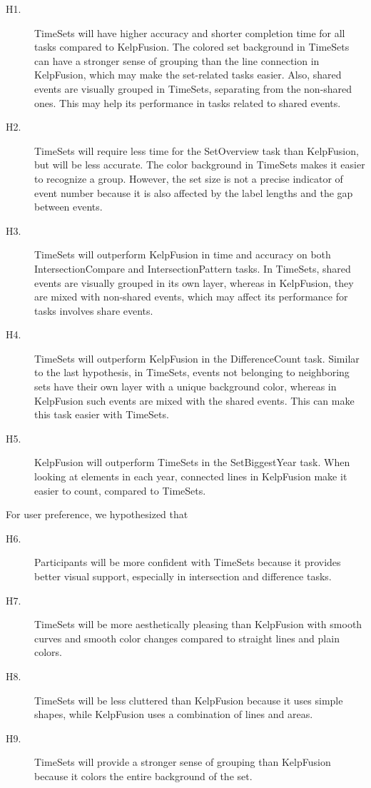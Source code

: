 \begin{description}
	\item [H1.] TimeSets will have higher accuracy and shorter completion time for all tasks compared to KelpFusion. The colored set background in TimeSets can have a stronger sense of grouping than the line connection in KelpFusion, which may make the set-related tasks easier. Also, shared events are visually grouped in TimeSets, separating from the non-shared ones. This may help its performance in tasks related to shared events.
	
	\item [H2.] TimeSets will require less time for the SetOverview task than KelpFusion, but will be less accurate. The color background in TimeSets makes it easier to recognize a group. However, the set size is not a precise indicator of event number because it is also affected by the label lengths and the gap between events.
	
	\item [H3.] TimeSets will outperform KelpFusion in time and accuracy on both IntersectionCompare and IntersectionPattern tasks. In TimeSets, shared events are visually grouped in its own layer, whereas in KelpFusion, they are mixed with non-shared events, which may affect its performance for tasks involves share events.
	
	\item [H4.] TimeSets will outperform KelpFusion in the DifferenceCount task. Similar to the last hypothesis, in TimeSets, events not belonging to neighboring sets have their own layer with a unique background color, whereas in KelpFusion such events are mixed with the shared events. This can make this task easier with TimeSets.
	
	\item [H5.] KelpFusion will outperform TimeSets in the SetBiggestYear task. When looking at elements in each year, connected lines in KelpFusion make it easier to count, compared to TimeSets.
\end{description}

For user preference, we hypothesized that
\begin{description}
	\item [H6.] Participants will be more confident with TimeSets because it provides better visual support, especially in intersection and difference tasks.
	
	\item [H7.] TimeSets will be more aesthetically pleasing than KelpFusion with smooth curves and smooth color changes compared to straight lines and plain colors.
	
	\item [H8.] TimeSets will be less cluttered than KelpFusion because it uses simple shapes, while KelpFusion uses a combination of lines and areas.
	
	\item [H9.] TimeSets will provide a stronger sense of grouping than KelpFusion because it colors the entire background of the set.
\end{description}

